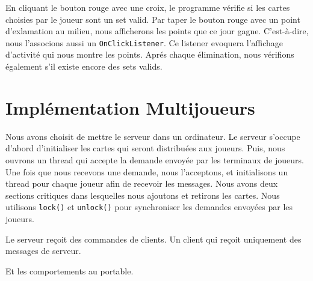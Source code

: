 \documentclass[titlepage,11pt,a4paper]{article}
\begin{document}
En cliquant le bouton rouge avec une croix, le programme vérifie si les cartes choisies par le joueur sont un set valid. Par taper le bouton rouge avec un point d'exlamation au milieu, nous afficherons les points que ce jour gagne. C'est-à-dire, nous l'associons aussi un \texttt{OnClickListener}. Ce listener evoquera l'affichage d'activité qui nous montre les points. Aprés chaque élimination, nous vérifions également s'il existe encore des sets valids.

\section{Implémentation Multijoueurs}
Nous avons choisit de mettre le serveur dans un ordinateur. Le serveur s'occupe d'abord d'initialiser les cartes qui seront distribuées aux joueurs. Puis, nous ouvrons un thread qui accepte la demande envoyée par les terminaux de joueurs. Une fois que nous recevons une demande, nous l'acceptons, et initialisons un thread pour chaque joueur afin de recevoir les messages. Nous avons deux sections critiques dans lesquelles nous ajoutons et retirons les cartes. Nous utilisons \texttt{lock()} et \texttt{unlock()} pour synchroniser les demandes envoyées par les joueurs.

Le serveur reçoit des commandes de clients. Un client qui reçoit uniquement des messages de serveur.

\begin{figure}[h]
\centering
{}
\end{figure}

Et les comportements au portable.
\begin{figure}[h]
\centering
{}
\end{figure}
\end{document}
